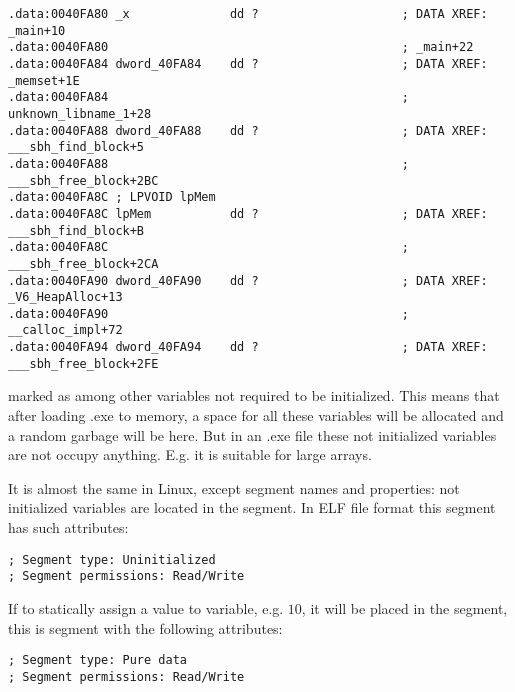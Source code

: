 \begin{lstlisting}
.data:0040FA80 _x              dd ?                    ; DATA XREF: _main+10
.data:0040FA80                                         ; _main+22
.data:0040FA84 dword_40FA84    dd ?                    ; DATA XREF: _memset+1E
.data:0040FA84                                         ; unknown_libname_1+28
.data:0040FA88 dword_40FA88    dd ?                    ; DATA XREF: ___sbh_find_block+5
.data:0040FA88                                         ; ___sbh_free_block+2BC
.data:0040FA8C ; LPVOID lpMem
.data:0040FA8C lpMem           dd ?                    ; DATA XREF: ___sbh_find_block+B
.data:0040FA8C                                         ; ___sbh_free_block+2CA
.data:0040FA90 dword_40FA90    dd ?                    ; DATA XREF: _V6_HeapAlloc+13
.data:0040FA90                                         ; __calloc_impl+72
.data:0040FA94 dword_40FA94    dd ?                    ; DATA XREF: ___sbh_free_block+2FE
\end{lstlisting}

{ marked as  among other variables not required to be initialized. 
This means that after loading .exe to memory, a space for all these variables will be 
allocated and a random garbage will be here. 
But in an .exe file these not initialized variables are not occupy anything. 
E.g. it is suitable for large arrays.}

{It is almost the same in Linux, except segment names and properties: 
not initialized variables are located in the  segment. 
In \ac{ELF} file format this segment has such attributes:}

\begin{lstlisting}
; Segment type: Uninitialized
; Segment permissions: Read/Write
\end{lstlisting}

{If to statically assign a value to variable, e.g. $10$, it will be placed in the  segment, 
this is segment with the following attributes:}

\begin{lstlisting}
; Segment type: Pure data
; Segment permissions: Read/Write
\end{lstlisting}

